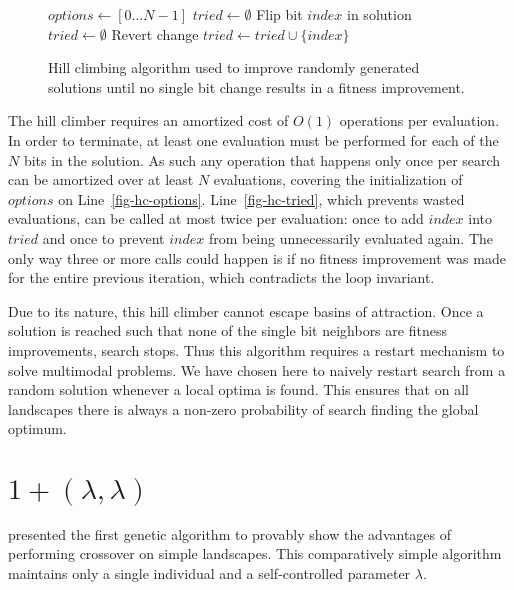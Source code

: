 \begin{figure}
  \begin{algorithmic}[1]
    \State $options \leftarrow [0 \dots N-1]$\label{fig-hc-options}
    \State $tried \leftarrow \emptyset$
        \label{fig-hc-tried}
          \State Flip bit $index$ in solution
            \State $tried \leftarrow \emptyset$
          \Else
            \State Revert change
          \EndIf
          \State $tried \leftarrow tried \cup \{index\}$
        \EndIf
      \EndFor
    \EndWhile
  \EndProcedure
\end{algorithmic}
  \caption{Hill climbing algorithm used to improve randomly generated solutions until no single
           bit change results in a fitness improvement.}
  \label{fig-hc}
\end{figure}

The hill climber requires an amortized cost of $O(1)$ operations per evaluation. In order to
terminate, at least one evaluation must be performed for each of the $N$ bits in the solution.
As such any operation that happens only once per search can be amortized over at least $N$
evaluations, covering the initialization of $options$ on Line~\ref{fig-hc-options}.
Line~\ref{fig-hc-tried}, which prevents wasted evaluations, can be called at most twice
per evaluation: once to add $index$ into $tried$ and once to prevent $index$ from being unnecessarily
evaluated again. The only way three or more calls could happen is if
no fitness improvement was made for the entire previous iteration, which contradicts the loop invariant.

Due to its nature, this hill climber cannot escape basins of attraction. Once a solution is reached
such that none of the single bit neighbors are fitness improvements, search stops. Thus
this algorithm requires a restart mechanism to solve multimodal problems. We have
chosen here to naively restart search from a random solution whenever a local optima is found. This
ensures that on all landscapes there is always a non-zero probability of search finding the global optimum.

\section{$1+(\lambda, \lambda)$}
\cite{doerr:2013:lambdalambda} presented the first genetic algorithm to provably show
the advantages of performing crossover on simple landscapes. This comparatively simple
algorithm maintains only a single individual and a self-controlled parameter $\lambda$.

